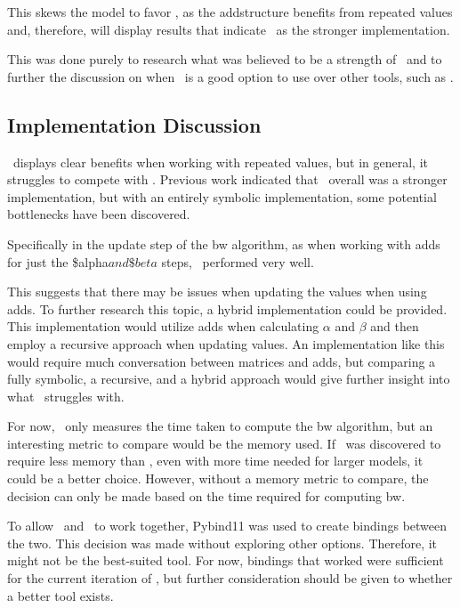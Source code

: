 This skews the model to favor \Cupaal, as the \gls{add}structure benefits from repeated values and, therefore, will display results that indicate \Cupaal\ as the stronger implementation.

This was done purely to research what was believed to be a strength of \Cupaal\ and to further the discussion on when \Cupaal\ is a good option to use over other tools, such as \Jajapy.


\subsection{Implementation Discussion} \label{subsec:implementation_discussion}
\Cupaal\ displays clear benefits when working with repeated values, but in general, it struggles to compete with \Jajapy.
Previous work indicated that \Cupaal\ overall was a stronger implementation, but with an entirely symbolic implementation, some potential bottlenecks have been discovered.

Specifically in the update step of the \gls{bw} algorithm, as when working with \glspl{add} for just the \$alpha$ and \$beta$ steps, \Cupaal\ performed very well.

    This suggests that there may be issues when updating the values when using \glspl{add}.
    To further research this topic, a hybrid implementation could be provided.
    This implementation would utilize \glspl{add} when calculating $\alpha$ and $\beta$ and then employ a recursive approach when updating values.
An implementation like this would require much conversation between matrices and \glspl{add}, but comparing a fully symbolic, a recursive, and a hybrid approach would give further insight into what \Cupaal\ struggles with.

For now, \Cupaal\ only measures the time taken to compute the \gls{bw} algorithm, but an interesting metric to compare would be the memory used.
If \Cupaal\ was discovered to require less memory than \Jajapy, even with more time needed for larger models, it could be a better choice.
However, without a memory metric to compare, the decision can only be made based on the time required for computing \gls{bw}.

To allow \Cupaal\ and \Jajapy\ to work together, Pybind11 was used to create bindings between the two.
This decision was made without exploring other options. Therefore, it might not be the best-suited tool.
For now, bindings that worked were sufficient for the current iteration of \Cupaal, but further consideration should be given to whether a better tool exists.

